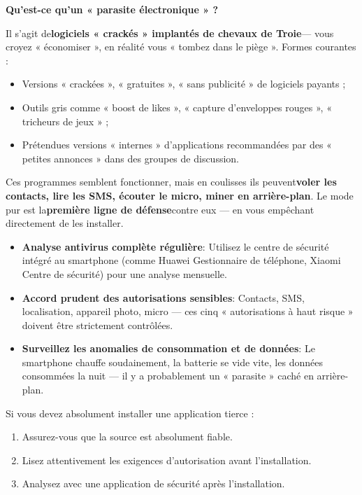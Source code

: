 \textbf{Qu'est-ce qu'un « parasite électronique » ?}\par

Il s'agit de\textbf{logiciels « crackés » implantés de chevaux de Troie}— vous croyez « économiser », en réalité vous « tombez dans le piège ». Formes courantes :

\begin{itemize}
  \item Versions « crackées », « gratuites », « sans publicité » de logiciels payants ;
  \item Outils gris comme « boost de likes », « capture d'enveloppes rouges », « tricheurs de jeux » ;
  \item Prétendues versions « internes » d'applications recommandées par des « petites annonces » dans des groupes de discussion.
\end{itemize}

Ces programmes semblent fonctionner, mais en coulisses ils peuvent\textbf{voler les contacts, lire les SMS, écouter le micro, miner en arrière-plan}. Le mode pur est la\textbf{première ligne de défense}contre eux — en vous empêchant directement de les installer.


\begin{itemize}
  \item \textbf{Analyse antivirus complète régulière}: Utilisez le centre de sécurité intégré au smartphone (comme Huawei Gestionnaire de téléphone, Xiaomi Centre de sécurité) pour une analyse mensuelle.
  \item \textbf{Accord prudent des autorisations sensibles}: Contacts, SMS, localisation, appareil photo, micro — ces cinq « autorisations à haut risque » doivent être strictement contrôlées.
  \item \textbf{Surveillez les anomalies de consommation et de données}: Le smartphone chauffe soudainement, la batterie se vide vite, les données consommées la nuit — il y a probablement un « parasite » caché en arrière-plan.
\end{itemize}

Si vous devez absolument installer une application tierce :

\begin{enumerate}
  \item Assurez-vous que la source est absolument fiable.
  \item Lisez attentivement les exigences d'autorisation avant l'installation.
  \item Analysez avec une application de sécurité après l'installation.
\end{enumerate}

